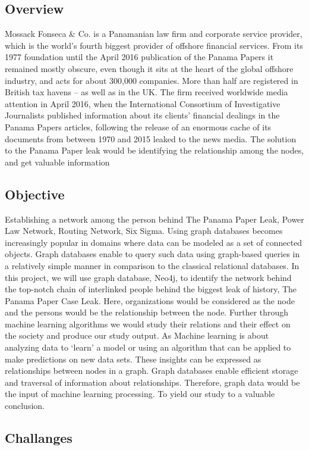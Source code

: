 \subsection{Overview}
Mossack Fonseca & Co. is a Panamanian law firm and corporate service provider, which is the world’s fourth biggest provider of offshore financial services. From its 1977 foundation until the April 2016 publication of the Panama Papers it remained mostly obscure, even though it sits at the heart of the global offshore industry, and acts for about 300,000 companies. More than half are registered in British tax havens – as well as in the UK. The firm received worldwide media attention in April 2016, when the International Consortium of Investigative Journalists published information about its clients' financial dealings in the Panama Papers articles, following the release of an enormous cache of its documents from between 1970 and 2015 leaked to the news media. The solution to the Panama Paper leak would be identifying the relationship among the nodes, and get valuable information
\subsection{Objective}
Establishing a network among the person behind The Panama Paper Leak, Power Law Network, Routing Network, Six Sigma. Using graph databases becomes increasingly popular in domains where data can be modeled as a set of connected objects. Graph databases enable to query such data using graph-based queries in a relatively simple manner in comparison to the classical relational databases. In this project, we will use graph database, Neo4j, to identify the network behind the top-notch chain of interlinked people behind the biggest leak of history, The Panama Paper Case Leak. Here, organizations would be considered as the node and the persons would be the relationship between the node. Further through machine learning algorithms we would study their relations and their effect on the society and produce our study output. As Machine learning is about analyzing data to ‘learn’ a model or using an algorithm that can be applied to make predictions on new data sets. These insights can be expressed as relationships between nodes in a graph. Graph databases enable efficient storage and traversal of information about relationships. Therefore, graph data would be the input of machine learning processing. To yield our study to a valuable conclusion.
\subsection{Challanges}

